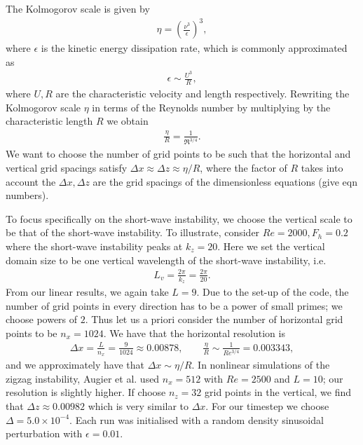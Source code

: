 The Kolmogorov scale is given by \cite{lesieur}
\begin{align}
\eta = \left(\frac{\nu^{3}}{\epsilon}\right)^{3},
\end{align}
where $\epsilon$ is the kinetic energy dissipation rate, which is commonly approximated as \cite{lindborg2006}
\begin{align}
\epsilon \sim \frac{U^{3}}{R} ,
\end{align}
where $U,R$ are the characteristic velocity and length respectively. Rewriting the Kolmogorov scale $\eta$ in terms of the Reynolds number by multiplying by the characteristic length $R$ we obtain
\begin{align}
\frac{\eta}{R} = \frac{1}{\Re^{3/4}}.
\end{align}
We want to choose the number of grid points to be such that the horizontal and vertical grid spacings satisfy $\Delta x \approx \Delta z \approx \eta/R$, where the factor of $R$ takes into account the $\Delta x, \Delta z$ are the grid spacings of the dimensionless equations (give eqn numbers).

To focus specifically on the short-wave instability, we choose the vertical scale to be that of the short-wave instability. To illustrate, consider $Re=2000, F_{h}=0.2$ where the short-wave instability peaks at $k_{z}=20$. Here we set the vertical domain size to be one vertical wavelength of the short-wave instability, i.e.
\begin{align}
L_{v} = \frac{2\pi}{k_{z}} = \frac{2\pi}{20}.
\end{align}
From our linear results, we again take $L=9$. Due to the set-up of the code, the number of grid points in every direction has to be a power of small primes; we choose powers of $2$. Thus let us a priori consider the number of horizontal grid points to be $n_{x}=1024$. We have that the horizontal resolution is
\begin{align}
\Delta x = \frac{L}{n_{x}} = \frac{9}{1024}\approx 0.00878,\qquad \frac{\eta}{R}\sim \frac{1}{Re^{3/4}}=0.003343,
\end{align}
and we approximately have that $\Delta x \sim \eta/R$. In nonlinear simulations of the zigzag instability, Augier et al.\cite{augierbillant2011} used $n_{x}=512$ with $Re=2500$ and $L=10$; our resolution is slightly higher. If choose $n_{z}=32$ grid points in the vertical, we find that $\Delta z \approx 0.00982$ which is very similar to $\Delta x$. For our timestep we choose $\Delta = 5.0\times 10^{-4}$. Each run was initialised with a random density sinusoidal perturbation with $\epsilon=0.01$. 

